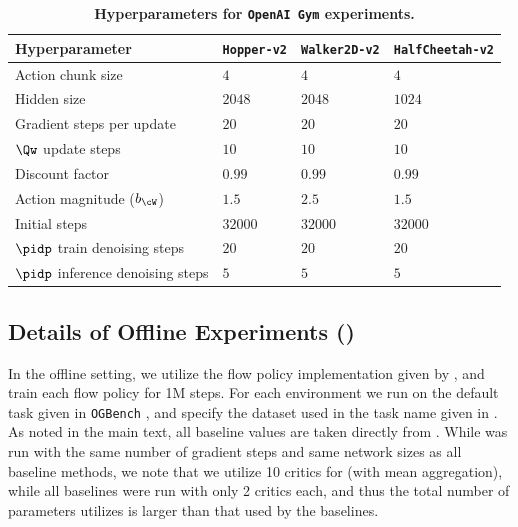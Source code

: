 \begin{table}
\caption{
\footnotesize
\textbf{Hyperparameters for \algname \texttt{OpenAI Gym} experiments.}
}
\vspace{5pt}
\begin{center}
\scalebox{0.9}
{
\begin{tabular}{llll}
    \toprule
    \textbf{Hyperparameter} &  \texttt{Hopper-v2} & \texttt{Walker2D-v2} & \texttt{HalfCheetah-v2} \\
    \midrule
Action chunk size  & $4$ & $4$ & $4$ \\
Hidden size & $2048$ & $2048$ & $1024$ \\
Gradient steps per update  & $20$ & $20$ & $20$ \\
$\Qw$ update steps & $10$ & $10$ &  $10$ \\
Discount factor  & $0.99$ & $0.99$ & $0.99$ \\
Action magnitude ($\actmag$)  & $1.5$ & $2.5$ & $1.5$ \\
Initial steps & $32000$ & $32000$ & $32000$ \\
$\pidp$ train denoising steps  & $20$ & $20$ & $20$ \\
$\pidp$ inference denoising steps & $5$ & $5$ &  $5$ \\
    \bottomrule
\end{tabular}
}
\end{center}
\end{table}






\subsection{Details of Offline Experiments ()}

In the offline setting, we utilize the flow policy implementation given by \citet{park2025flow}, and train each flow policy for 1M steps. For each environment we run on the default task given in \texttt{OGBench} \cite{park2024ogbench}, and specify the dataset used in the task name given in . As noted in the main text, all baseline values are taken directly from \cite{park2025flow}. While \algname was run with the same number of gradient steps and same network sizes as all baseline methods, we note that we utilize 10 critics for \algname (with mean aggregation), while all baselines were run with only 2 critics each, and thus the total number of parameters \algname utilizes is larger than that used by the baselines.

